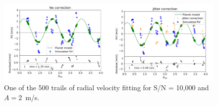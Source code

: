 \begin{figure}[tbp]	
\centering
\includegraphics[width = 0.99 \linewidth]
{./Figures/Methods/Fitting_p2j2sn10000.png}
\caption[Planet recovery ($A = 2$~m/s, S/N = 10,000)]
{One of the 500 trails of radial velocity fitting for S/N = 10,000 and $A = 2$~m/s.}
\label{fig:Planet_recovery_10000}
\end{figure}    

